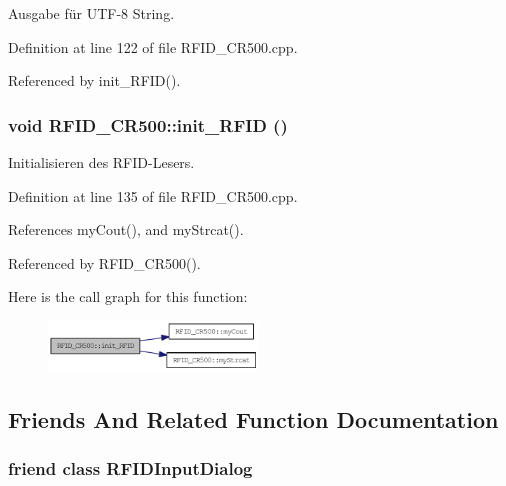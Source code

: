 Ausgabe für UTF-8 String. 



Definition at line 122 of file RFID\_\-CR500.cpp.

Referenced by init\_\-RFID().\hypertarget{class_r_f_i_d___c_r500_ce1fec5794623260b5e697762899bc73}{
\subsubsection[init\_\-RFID]{\setlength{\rightskip}{0pt plus 5cm}void RFID\_\-CR500::init\_\-RFID ()}}
\label{class_r_f_i_d___c_r500_ce1fec5794623260b5e697762899bc73}


Initialisieren des RFID-Lesers. 



Definition at line 135 of file RFID\_\-CR500.cpp.

References myCout(), and myStrcat().

Referenced by RFID\_\-CR500().

Here is the call graph for this function:\nopagebreak
\begin{figure}[H]
\begin{center}
\leavevmode
\includegraphics[width=158pt]{class_r_f_i_d___c_r500_ce1fec5794623260b5e697762899bc73_cgraph}
\end{center}
\end{figure}


\subsection{Friends And Related Function Documentation}
\hypertarget{class_r_f_i_d___c_r500_3700c0c9e8357fc4d1f1014315681074}{
\subsubsection[RFIDInputDialog]{\setlength{\rightskip}{0pt plus 5cm}friend class {\bf RFIDInputDialog}}}
\label{class_r_f_i_d___c_r500_3700c0c9e8357fc4d1f1014315681074}




